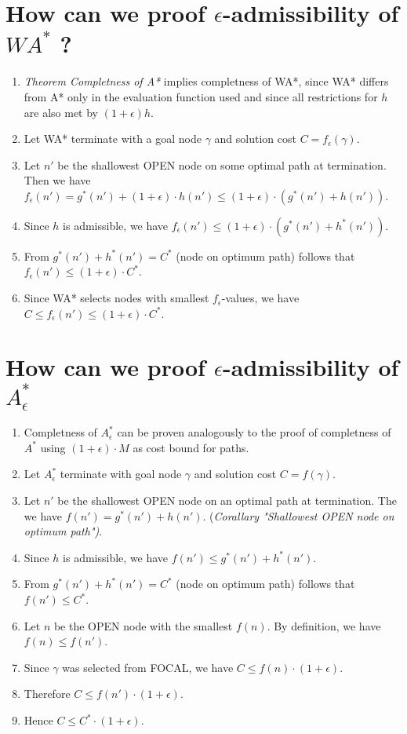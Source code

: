 \documentclass[12pt, a4paper]{article}
\begin{document}
\section{How can we proof $\epsilon$-admissibility of $WA^*$ ?}
\begin{enumerate}
\item \textit{Theorem Completness of A*} implies completness of WA*, since WA* differs from A* only in the evaluation function used and since all restrictions for $h$ are also met by $(1 + \epsilon) h$.
\item Let WA* terminate with a goal node $\gamma$ and solution cost $C = f_{\epsilon}(\gamma)$.
\item Let $n'$ be the shallowest OPEN node on some optimal path at termination. Then we have $f_{\epsilon}(n') = g^*(n') + (1 + \epsilon) \cdot h(n') \leq (1 + \epsilon) \cdot (g^*(n') + h(n')) $.
\item Since $h$ is admissible, we have $f_{\epsilon}(n') \leq (1 + \epsilon) \cdot (g^*(n') + h^*(n'))$.
\item From $g^*(n') + h^*(n') = C^*$ (node on optimum path) follows that $f_\epsilon(n') \leq (1 + \epsilon) \cdot C^*$.
\item Since WA* selects nodes with smallest $f_{\epsilon}$-values, we have $C \leq f_\epsilon(n') \leq (1 + \epsilon) \cdot C^*$.
\end{enumerate}

\section{How can we proof $\epsilon$-admissibility of $A^*_\epsilon$}
\begin{enumerate}
\item Completness of $A^*_\epsilon$ can be proven analogously to the proof of completness of $A^*$ using $(1 + \epsilon) \cdot M$ as cost bound for paths. 
\item Let $A^*_\epsilon$ terminate with goal node $\gamma$ and solution cost $C = f(\gamma)$.
\item Let $n'$ be the shallowest OPEN node on an optimal path at termination. The we have $f(n') = g^*(n') + h(n').$ (\textit{Corallary "Shallowest OPEN node on optimum path")}.
\item Since $h$ is admissible, we have $f(n') \leq g^*(n') + h^*(n')$.
\item From $g^*(n') + h^*(n') = C^*$ (node on optimum path) follows that $f(n') \leq C^*$.
\item Let $n$ be the OPEN node with the smallest $f(n)$. By definition, we have $f(n) \leq f(n')$.
\item Since $\gamma$ was selected from FOCAL, we have $C \leq f(n) \cdot (1 + \epsilon)$.
\item Therefore $C \leq f(n') \cdot (1 + \epsilon)$.
\item Hence $C \leq C^* \cdot (1 + \epsilon)$. 
\end{enumerate}
\end{document}
